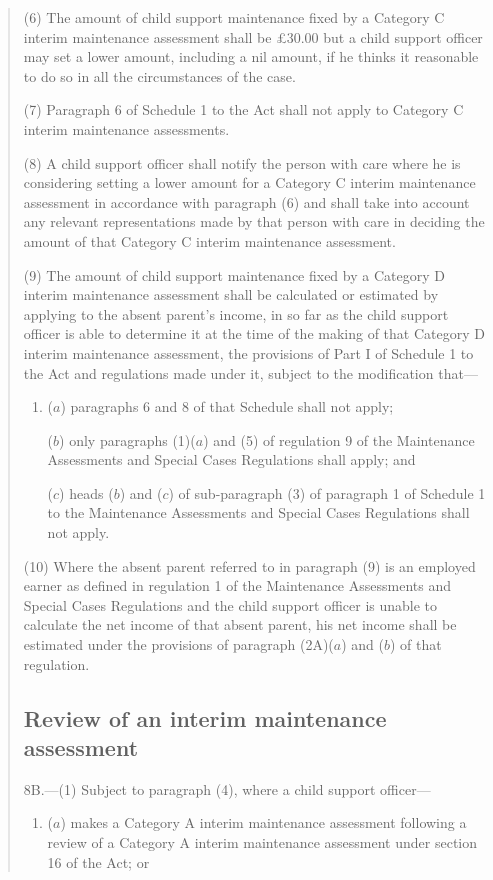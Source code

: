\documentclass[12pt,a4paper]{article}
\begin{document}
\begin{quotation}
(6) The amount of child support maintenance fixed by a Category C interim maintenance assessment shall be £30.00 but a child support officer may set a lower amount, including a nil amount, if he thinks it reasonable to do so in all the circumstances of the case.

(7) Paragraph 6 of Schedule 1 to the Act shall not apply to Category C interim maintenance assessments.

(8) A child support officer shall notify the person with care where he is considering setting a lower amount for a Category C interim maintenance assessment in accordance with paragraph (6) and shall take into account any relevant representations made by that person with care in deciding the amount of that Category C interim maintenance assessment.

(9) The amount of child support maintenance fixed by a Category D interim maintenance assessment shall be calculated or estimated by applying to the absent parent’s income, in so far as the child support officer is able to determine it at the time of the making of that Category D interim maintenance assessment, the provisions of Part I of Schedule 1 to the Act and regulations made under it, subject to the modification that—
\begin{enumerate}\item[]
($a$) paragraphs 6 and 8 of that Schedule shall not apply;

($b$) only paragraphs (1)($a$) and (5) of regulation 9 of the Maintenance Assessments and Special Cases Regulations shall apply; and

($c$) heads ($b$) and ($c$) of sub-paragraph (3) of paragraph 1 of Schedule 1 to the Maintenance Assessments and Special Cases Regulations shall not apply.
\end{enumerate}

(10) Where the absent parent referred to in paragraph (9) is an employed earner as defined in regulation 1 of the Maintenance Assessments and Special Cases Regulations and the child support officer is unable to calculate the net income of that absent parent, his net income shall be estimated under the provisions of paragraph (2A)($a$) and ($b$) of that regulation.

\subsection*{Review of an interim maintenance assessment}

8B.—(1) Subject to paragraph (4), where a child support officer—
\begin{enumerate}\item[]
($a$) makes a Category A interim maintenance assessment following a review of a Category A interim maintenance assessment under section 16 of the Act; or


\end{enumerate}
\end{quotation}
\end{document}
